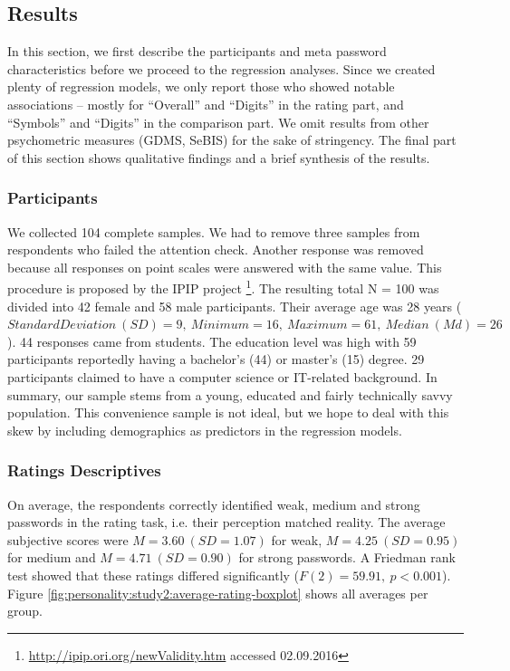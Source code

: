 \subsection{Results}
In this section, we first describe the participants and meta password characteristics before we proceed to the regression analyses. Since we created plenty of regression models, we only report those who showed notable associations -- mostly for ``Overall'' and ``Digits'' in the rating part, and ``Symbols'' and ``Digits'' in the comparison part. We omit results from other psychometric measures (GDMS, SeBIS) for the sake of stringency. The final part of this section shows qualitative findings and a brief synthesis of the results. 

\subsubsection{Participants}
We collected 104 complete samples. We had to remove three samples from respondents who failed the attention check. Another response was removed because all responses on point scales were answered with the same value. This procedure is proposed by the IPIP project \footnote{\url{http://ipip.ori.org/newValidity.htm} accessed 02.09.2016}. The resulting total N = 100 was divided into 42 female and 58 male participants. Their average age was 28 years ($Standard Deviation~(SD) = 9,~Minimum = 16,~Maximum = 61,~Median~(Md) = 26$). 44 responses came from students. The education level was high with 59 participants reportedly having a bachelor's (44) or master's (15) degree. 29 participants claimed to have a computer science or IT-related background. In summary, our sample stems from a young, educated and fairly technically savvy population. This convenience sample is not ideal, but we hope to deal with this skew by including demographics as predictors in the regression models.

\subsubsection{Ratings Descriptives}
On average, the respondents correctly identified weak, medium and strong passwords in the rating task, i.e. their perception matched reality. The average subjective scores were $M=3.60~(SD=1.07)$ for weak, $M=4.25~(SD=0.95)$ for medium and $M=4.71~(SD=0.90)$ for strong passwords. A Friedman rank test showed that these ratings differed significantly ($F(2)=59.91,~p < 0.001$). Figure \ref{fig:personality:study2:average-rating-boxplot} shows all averages per group.


